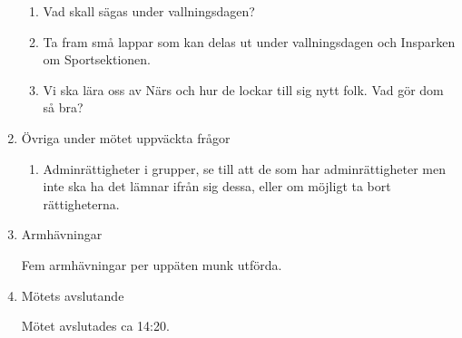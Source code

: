 \documentclass[12pt,a4paper]{article}
\begin{document}
\begin{enumerate}
\begin{enumerate}
				\item Vad skall sägas under vallningsdagen?
				
				\item Ta fram små lappar som kan delas ut under vallningsdagen och Insparken om Sportsektionen.
				
				\item Vi ska lära oss av Närs och hur de lockar till sig nytt folk. Vad gör dom så bra?
					
			\end{enumerate}
		    
		\item Övriga under mötet uppväckta frågor
			\begin{enumerate}
			
				\item Adminrättigheter i grupper, se till att de som har adminrättigheter men inte ska ha det lämnar ifrån sig dessa, eller om möjligt ta bort rättigheterna.
					
			\end{enumerate}
			
		\item Armhävningar
		
		    Fem armhävningar per uppäten munk utförda.
		
		\item Mötets avslutande
		
		    Mötet avslutades ca 14:20.
		
	\end{enumerate}
\end{document}

